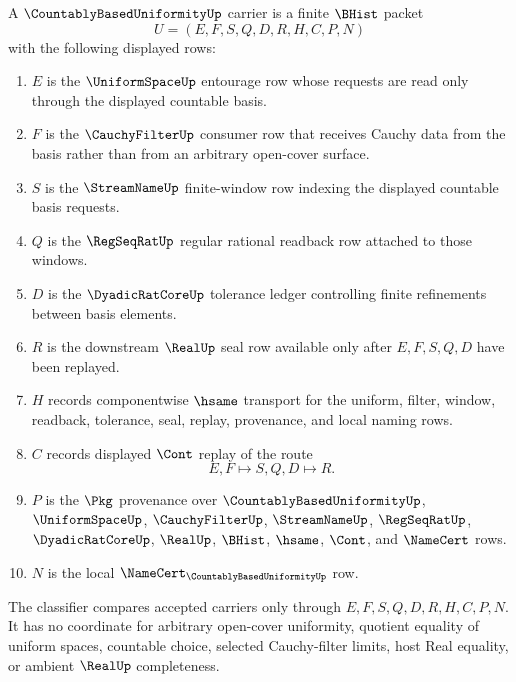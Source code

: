 \begin{definition}
\label{def:countably-based-uniformity-carrier}
A $\CountablyBasedUniformityUp$ carrier is a finite $\BHist$ packet
$$
U=(E,F,S,Q,D,R,H,C,P,N)
$$
with the following displayed rows:
\begin{enumerate}
\item $E$ is the $\UniformSpaceUp$ entourage row whose requests are read only through the displayed countable basis.
\item $F$ is the $\CauchyFilterUp$ consumer row that receives Cauchy data from the basis rather than from an arbitrary open-cover surface.
\item $S$ is the $\StreamNameUp$ finite-window row indexing the displayed countable basis requests.
\item $Q$ is the $\RegSeqRatUp$ regular rational readback row attached to those windows.
\item $D$ is the $\DyadicRatCoreUp$ tolerance ledger controlling finite refinements between basis elements.
\item $R$ is the downstream $\RealUp$ seal row available only after $E,F,S,Q,D$ have been replayed.
\item $H$ records componentwise $\hsame$ transport for the uniform, filter, window, readback, tolerance, seal, replay, provenance, and local naming rows.
\item $C$ records displayed $\Cont$ replay of the route
$$
E,F \longmapsto S,Q,D \longmapsto R .
$$
\item $P$ is the $\Pkg$ provenance over $\CountablyBasedUniformityUp$, $\UniformSpaceUp$, $\CauchyFilterUp$, $\StreamNameUp$, $\RegSeqRatUp$, $\DyadicRatCoreUp$, $\RealUp$, $\BHist$, $\hsame$, $\Cont$, and $\NameCert$ rows.
\item $N$ is the local $\NameCert_{\CountablyBasedUniformityUp}$ row.
\end{enumerate}
The classifier compares accepted carriers only through $E,F,S,Q,D,R,H,C,P,N$. It has no coordinate for arbitrary open-cover uniformity, quotient equality of uniform spaces, countable choice, selected Cauchy-filter limits, host Real equality, or ambient $\RealUp$ completeness.
\end{definition}

